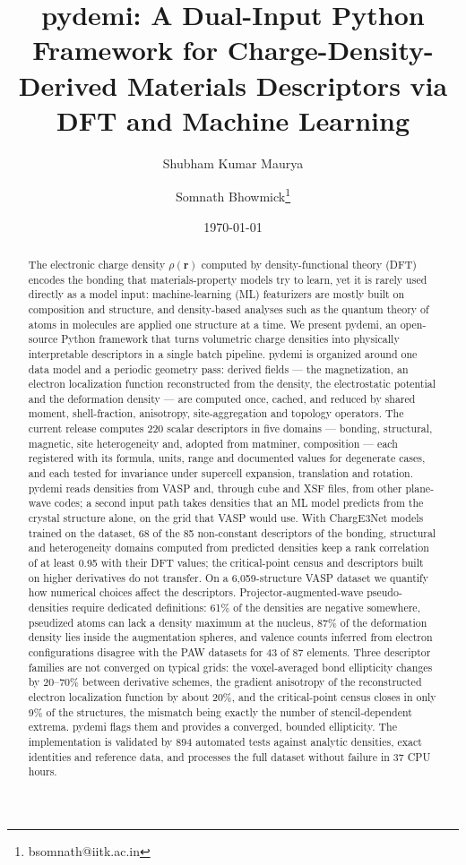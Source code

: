 \documentclass[11pt,a4paper]{article}
\title{\textbf{pydemi: A Dual-Input Python Framework for Charge-Density-Derived Materials Descriptors via DFT and Machine Learning}}
\author[1]{Shubham Kumar Maurya}
\author[1]{Somnath Bhowmick\thanks{bsomnath@iitk.ac.in}}
\affil[1]{Department of Materials Science \& Engineering, Indian Institute of Technology Kanpur, Kanpur 208016, India}
\date{\today}
\begin{document}
\maketitle

\begin{abstract}
The electronic charge density $\rho(\mathbf{r})$ computed by density-functional
theory (DFT) encodes the bonding that materials-property models try to learn,
yet it is rarely used directly as a model input: machine-learning (ML)
featurizers are mostly built on composition and structure, and density-based
analyses such as the quantum theory of atoms in molecules are applied one
structure at a time. We present pydemi, an open-source Python framework that
turns volumetric charge densities into physically interpretable descriptors in
a single batch pipeline. pydemi is organized around one data model and a
periodic geometry pass: derived fields --- the magnetization, an electron
localization function reconstructed from the density, the electrostatic
potential and the deformation density --- are computed once, cached, and
reduced by shared moment, shell-fraction, anisotropy, site-aggregation and
topology operators. The current release computes 220 scalar descriptors in
five domains --- bonding, structural, magnetic, site heterogeneity and,
adopted from matminer, composition --- each registered with its formula,
units, range and documented values for degenerate cases, and each tested for
invariance under supercell expansion, translation and rotation. pydemi reads
densities from VASP and, through cube and XSF files, from other plane-wave
codes; a second input path takes densities that an ML model predicts from the
crystal structure alone, on the grid that VASP would use. With ChargE3Net models
trained on the dataset, 68 of the 85 non-constant descriptors of the bonding,
structural and heterogeneity domains computed from predicted densities keep a
rank correlation of at least 0.95 with their DFT values; the critical-point
census and descriptors built on higher derivatives do not transfer.
On a 6,059-structure VASP dataset we quantify how numerical choices affect
the descriptors. Projector-augmented-wave pseudo-densities require dedicated
definitions: 61\% of the densities are negative somewhere, pseudized atoms can
lack a density maximum at the nucleus, 87\% of the deformation density lies
inside the augmentation spheres, and valence counts inferred from electron
configurations disagree with the PAW datasets for 43 of 87 elements. Three
descriptor families are not converged on typical grids: the voxel-averaged
bond ellipticity changes by 20--70\% between derivative schemes, the gradient
anisotropy of the reconstructed electron localization function by about 20\%,
and the critical-point census closes in only 9\% of the structures, the
mismatch being exactly the number of stencil-dependent extrema. pydemi flags
them and provides a converged, bounded ellipticity. The implementation is validated by
894 automated tests against analytic densities, exact identities and
reference data, and processes the full dataset without failure in 37 CPU
hours.
\end{abstract}
\end{document}
